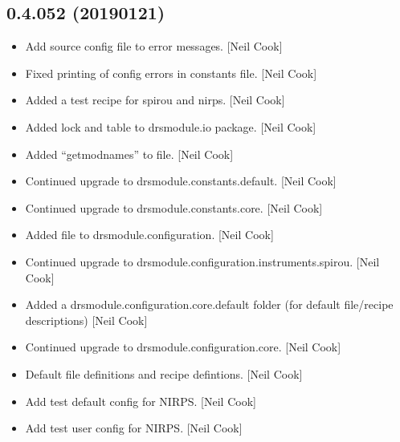 \documentclass[a4paper,10pt,english]{report}
\begin{document}
\subsection{0.4.052 (2019\sphinxhyphen{}01\sphinxhyphen{}21)}
\label{\detokenize{misc/changelog:id230}}\begin{itemize}
\item {} 
Add source config file to error messages. {[}Neil Cook{]}

\item {} 
Fixed printing of config errors in constants file. {[}Neil Cook{]}

\item {} 
Added a test recipe for spirou and nirps. {[}Neil Cook{]}

\item {} 
Added lock and table to drsmodule.io package. {[}Neil Cook{]}

\item {} 
Added “getmodnames” to  file. {[}Neil Cook{]}

\item {} 
Continued upgrade to drsmodule.constants.default. {[}Neil Cook{]}

\item {} 
Continued upgrade to drsmodule.constants.core. {[}Neil Cook{]}

\item {} 
Added  file to drsmodule.configuration. {[}Neil Cook{]}

\item {} 
Continued upgrade to drsmodule.configuration.instruments.spirou. {[}Neil
Cook{]}

\item {} 
Added a drsmodule.configuration.core.default folder (for default
file/recipe descriptions) {[}Neil Cook{]}

\item {} 
Continued upgrade to drsmodule.configuration.core. {[}Neil Cook{]}

\item {} 
Default file definitions and recipe defintions. {[}Neil Cook{]}

\item {} 
Add test default config for NIRPS. {[}Neil Cook{]}

\item {} 
Add test user config for NIRPS. {[}Neil Cook{]}

\end{itemize}
\end{document}
